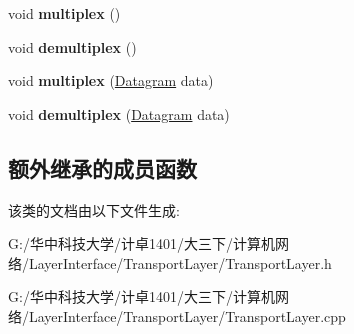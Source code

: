 \begin{DoxyCompactItemize}
\mbox{\label{class_c_transport_layer_abce8f3ca4b9c4d5c957b0f7b6746f289}} 
void {\bfseries multiplex} ()
\item 
\mbox{\label{class_c_transport_layer_a3cbec0cdcdcf91df91ae7c708d8a414c}} 
void {\bfseries demultiplex} ()
\item 
\mbox{\label{class_c_transport_layer_aa5d4c185f3a0f9c968d51caf46f7332e}} 
void {\bfseries multiplex} (\hyperlink{class_datagram}{Datagram} data)
\item 
\mbox{\label{class_c_transport_layer_a316dd2a423992b04d77d42198c4e421c}} 
void {\bfseries demultiplex} (\hyperlink{class_datagram}{Datagram} data)
\end{DoxyCompactItemize}
\subsection*{额外继承的成员函数}


该类的文档由以下文件生成\+:\begin{DoxyCompactItemize}
\item 
G\+:/华中科技大学/计卓1401/大三下/计算机网络/\+Layer\+Interface/\+Transport\+Layer/Transport\+Layer.\+h\item 
G\+:/华中科技大学/计卓1401/大三下/计算机网络/\+Layer\+Interface/\+Transport\+Layer/Transport\+Layer.\+cpp\end{DoxyCompactItemize}
